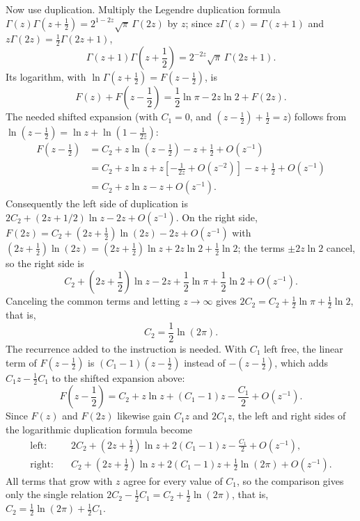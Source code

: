 Now use duplication.  Multiply the Legendre duplication formula
$\Gamma(z)\Gamma(z+\frac12)=2^{1-2z}\sqrt\pi\,\Gamma(2z)$ by $z$;
since $z\Gamma(z)=\Gamma(z+1)$ and $z\Gamma(2z)=\frac12\Gamma(2z+1)$,
\[
\Gamma(z+1)\Gamma\left(z+\frac12\right)
=2^{-2z}\sqrt\pi\,\Gamma(2z+1).
\]
Its logarithm, with $\ln\Gamma(z+\frac12)=F(z-\frac12)$, is
\[
F(z)+F\left(z-\frac12\right)
=\frac12\ln\pi-2z\ln2+F(2z).
\]
The needed shifted expansion (with $C_1=0$, and
$(z-\frac12)+\frac12=z$) follows from
$\ln(z-\frac12)=\ln z+\ln(1-\frac1{2z})$:
\begin{align*}
F\left(z-\frac12\right)
&=C_2+z\ln\left(z-\frac12\right)-z+\frac12+O(z^{-1})\\
&=C_2+z\ln z+z\left[-\frac1{2z}+O(z^{-2})\right]
-z+\frac12+O(z^{-1})\\
&=C_2+z\ln z-z+O(z^{-1}).
\end{align*}
Consequently the left side of duplication is
$2C_2+(2z+1/2)\ln z-2z+O(z^{-1})$.  On the right side,
$F(2z)=C_2+(2z+\frac12)\ln(2z)-2z+O(z^{-1})$ with
$(2z+\frac12)\ln(2z)=(2z+\frac12)\ln z+2z\ln2+\frac12\ln2$; the
terms $\pm2z\ln2$ cancel, so the right side is
\[
C_2+\left(2z+\frac12\right)\ln z-2z
+\frac12\ln\pi+\frac12\ln2+O(z^{-1}).
\]
Canceling the common terms and letting $z\to\infty$ gives
$2C_2=C_2+\frac12\ln\pi+\frac12\ln2$, that is,
\[
\boxed{C_2=\frac12\ln(2\pi)}.
\]
The recurrence added to the instruction is needed.  With $C_1$
left free, the linear term of $F(z-\frac12)$ is
$(C_1-1)(z-\frac12)$ instead of $-(z-\frac12)$, which adds
$C_1z-\frac12C_1$ to the shifted expansion above:
\[
F\left(z-\frac12\right)=C_2+z\ln z+(C_1-1)z-\frac{C_1}2+O(z^{-1}).
\]
Since $F(z)$ and $F(2z)$ likewise gain $C_1z$ and $2C_1z$, the
left and right sides of the logarithmic duplication formula become
\begin{align*}
\text{left:}\quad&2C_2+\left(2z+\frac12\right)\ln z+2(C_1-1)z
-\frac{C_1}2+O(z^{-1}),\\
\text{right:}\quad&C_2+\left(2z+\frac12\right)\ln z+2(C_1-1)z
+\frac12\ln(2\pi)+O(z^{-1}).
\end{align*}
All terms that grow with $z$ agree for every value of $C_1$, so
the comparison gives only the single relation
$2C_2-\frac12C_1=C_2+\frac12\ln(2\pi)$, that is,
$C_2=\frac12\ln(2\pi)+\frac12C_1$.



